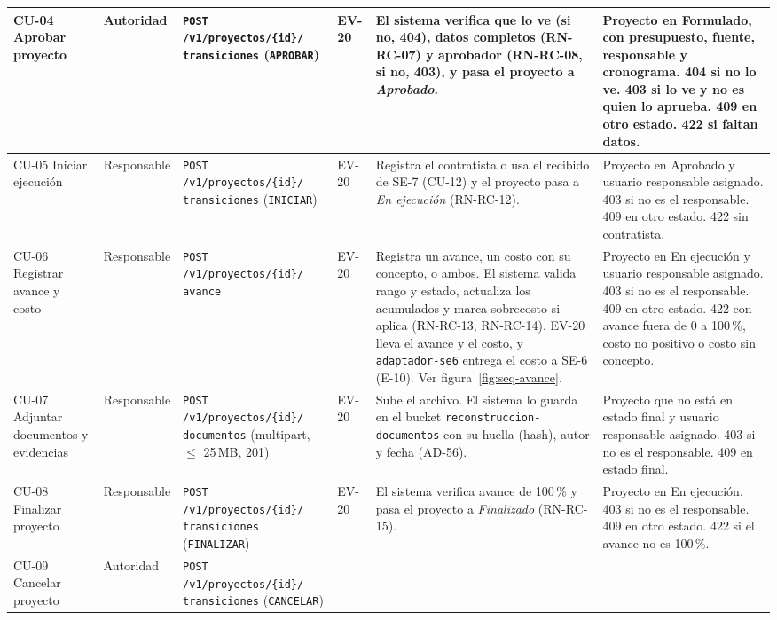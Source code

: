 \documentclass[11pt,a4paper]{article}
\begin{document}
{\begin{longtable}{|P{1.8cm}|P{1.9cm}|P{3.1cm}|P{1.2cm}|P{3.3cm}|P{2.9cm}|}
  CU-04 Aprobar proyecto & Autoridad
    & {\footnotesize\texttt{POST /v1/proyectos/\{id\}/ transiciones}} (\texttt{APROBAR})
    & EV-20
    & El sistema verifica que lo ve (si no, 404), datos completos (RN-RC-07) y aprobador (RN-RC-08, si no, 403), y
      pasa el proyecto a \emph{Aprobado}.
    & Proyecto en Formulado, con presupuesto, fuente, responsable y cronograma. 404 si no lo ve. 403 si lo ve y no es quien lo aprueba. 409 en otro estado. 422 si faltan datos. \\ \hline
  CU-05 Iniciar ejecución & Responsable
    & {\footnotesize\texttt{POST /v1/proyectos/\{id\}/ transiciones}} (\texttt{INICIAR})
    & EV-20
    & Registra el contratista o usa el recibido de SE-7 (CU-12) y el proyecto pasa a \emph{En ejecución}
      (RN-RC-12).
    & Proyecto en Aprobado y usuario responsable asignado. 403 si no es el responsable. 409 en otro estado. 422 sin contratista. \\ \hline
  CU-06 Registrar avance y costo & Responsable
    & {\footnotesize\texttt{POST /v1/proyectos/\{id\}/ avance}}
    & EV-20
    & Registra un avance, un costo con su concepto, o ambos. El sistema valida rango y estado, actualiza los
      acumulados y marca sobrecosto si aplica (RN-RC-13, RN-RC-14). EV-20 lleva el avance y el costo, y
      \texttt{adaptador-se6} entrega el costo a SE-6 (E-10). Ver figura~\ref{fig:seq-avance}.
    & Proyecto en En ejecución y usuario responsable asignado. 403 si no es el responsable. 409 en otro estado. 422 con avance fuera de 0 a 100\,\%, costo no positivo o costo sin concepto. \\ \hline
  CU-07 Adjuntar documentos y evidencias & Responsable
    & {\footnotesize\texttt{POST /v1/proyectos/\{id\}/ documentos}} (multipart, $\le$ 25\,MB, 201)
    & EV-20
    & Sube el archivo. El sistema lo guarda en el bucket \texttt{reconstruccion-}\allowbreak\texttt{documentos} con su huella (hash),
      autor y fecha (AD-56).
    & Proyecto que no está en estado final y usuario responsable asignado. 403 si no es el responsable. 409 en estado final. \\ \hline
  CU-08 Finalizar proyecto & Responsable
    & {\footnotesize\texttt{POST /v1/proyectos/\{id\}/ transiciones}} (\texttt{FINALIZAR})
    & EV-20
    & El sistema verifica avance de 100\,\% y pasa el proyecto a \emph{Finalizado} (RN-RC-15).
    & Proyecto en En ejecución. 403 si no es el responsable. 409 en otro estado. 422 si el avance no es 100\,\%. \\ \hline
  CU-09 Cancelar proyecto & Autoridad
    & {\footnotesize\texttt{POST /v1/proyectos/\{id\}/ transiciones}} (\texttt{CANCELAR})

\end{longtable}}
\end{document}

